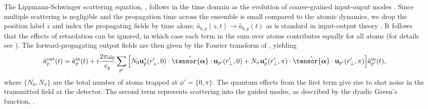 \documentclass[preprint, aps,pra,onecolumn]{revtex4-1} %
\newcommand{\poltens}{\hat{\tensor{\boldsymbol{\alpha}}}}
\begin{document}
The Lippmann-Schwinger scattering equation, , follows in the time domain as the evolution of coarse-grained input-ouput modes \cite{gardiner_input_1985, fan_input-output_2010, le_kien_propagation_2014}.  
Since multiple scattering is negligible and the propagation time across the ensemble is small compared to the atomic dynamics, we drop the position label $z$ and index the propagating fields by time alone; $\hat{a}_{b,p}(z,t) \rightarrow \hat{a}_{b,p}(t) $ as is standard in input-output theory \cite{gardiner_input_1985, stockton_deterministic_2004} . 
It follows that the effects of retardation can be ignored, in which case each term in the sum over atoms contributes equally for all atoms (for details see \cite{le_kien_correlations_2008, baragiola_open_2014}).  
The forward-propagating output fields are then given by the Fourier transform of , yielding \cite{le_kien_correlations_2008} 
\begin{align} \label{Eq::ScatteringSolution}
		\hat{a}^{\rm out}_{p}(t) = \hat{a}^{\rm in}_{p}(t) + i  \frac{2\pi \omega_0}{v_g}\sum_{p'}\Big[ N_0  \mathbf{u}^*_p(r'_\perp,0) \cdot \poltens \cdot  \mathbf{u}_{p'}(r'_\perp,0)  + N_\pi \mathbf{u}^*_p(r'_\perp,\pi) \cdot \poltens \cdot  \mathbf{u}_{p'}(r'_\perp,\pi) \Big] \hat{a}^{\rm in}_{p'}(t), 
	\end{align} 
where $\{N_0,N_\pi \}$ are the total number of atoms trapped at $\phi' = \{0,\pi\}$. The quantum effects from the first term give rise to shot noise in the transmitted field at the detector.  
The second term represents scattering into the guided modes, as described by the dyadic Green's function, .  
\end{document}
